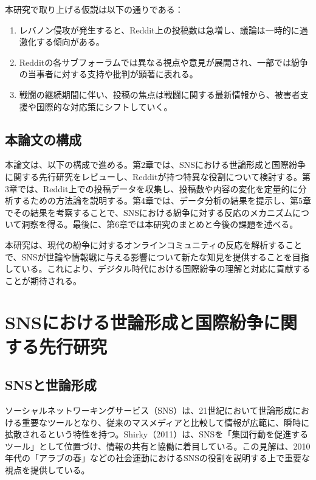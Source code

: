 \documentclass[11pt, a4j]{jreport}
\begin{document}
    本研究で取り上げる仮説は以下の通りである：

    \begin{enumerate}
        \item レバノン侵攻が発生すると、Reddit上の投稿数は急増し、議論は一時的に過激化する傾向がある。

        \item Redditの各サブフォーラムでは異なる視点や意見が展開され、一部では紛争の当事者に対する支持や批判が顕著に表れる。

        \item 戦闘の継続期間に伴い、投稿の焦点は戦闘に関する最新情報から、被害者支援や国際的な対応策にシフトしていく。
    \end{enumerate}

    \section{本論文の構成}
    本論文は、以下の構成で進める。第2章では、SNSにおける世論形成と国際紛争に関する先行研究をレビューし、Redditが持つ特異な役割について検討する。第3章では、Reddit上での投稿データを収集し、投稿数や内容の変化を定量的に分析するための方法論を説明する。第4章では、データ分析の結果を提示し、第5章でその結果を考察することで、SNSにおける紛争に対する反応のメカニズムについて洞察を得る。最後に、第6章では本研究のまとめと今後の課題を述べる。

    本研究は、現代の紛争に対するオンラインコミュニティの反応を解析することで、SNSが世論や情報戦に与える影響について新たな知見を提供することを目指している。これにより、デジタル時代における国際紛争の理解と対応に貢献することが期待される。

    \chapter{SNSにおける世論形成と国際紛争に関する先行研究}

    \section{SNSと世論形成}
    ソーシャルネットワーキングサービス（SNS）は、21世紀において世論形成における重要なツールとなり、従来のマスメディアと比較して情報が広範に、瞬時に拡散されるという特性を持つ。Shirky（2011）は、SNSを「集団行動を促進するツール」として位置づけ、情報の共有と協働に着目している。この見解は、2010年代の「アラブの春」などの社会運動におけるSNSの役割を説明する上で重要な視点を提供している。
\end{document}
